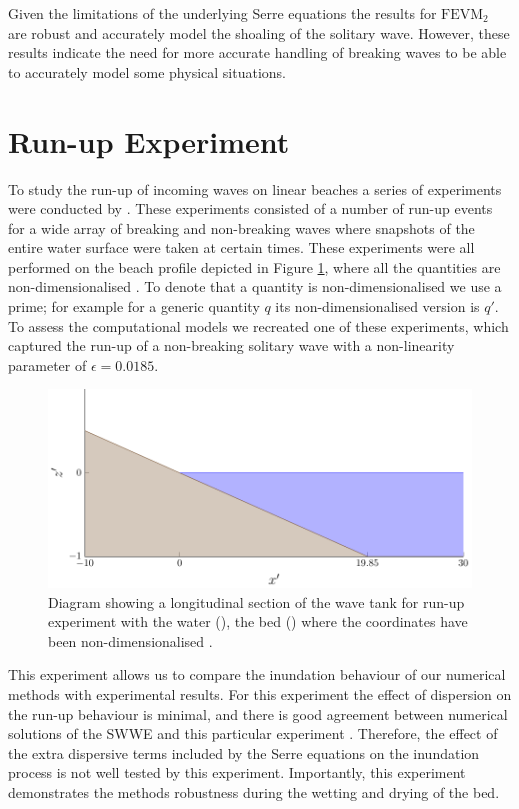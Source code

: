 Given the limitations of the underlying Serre equations the results for $\text{FEVM}_2$ are robust and accurately model the shoaling of the solitary wave. However, these results indicate the need for more accurate handling of breaking waves to be able to accurately model some physical situations. 

\section{Run-up Experiment}
To study the run-up of incoming waves on linear beaches a series of experiments were conducted by \citet{Synolakis-1987-523}. These experiments consisted of a number of run-up events for a wide array of breaking and non-breaking waves where snapshots of the entire water surface were taken at certain times. These experiments were all performed on the beach profile depicted in Figure \ref{fig:SynolakisWT}, where all the quantities are non-dimensionalised \cite{Synolakis-1987-523}. To denote that a quantity is non-dimensionalised we use a prime; for example for a generic quantity $q$ its non-dimensionalised version is $q'$. To assess the computational models we recreated one of these experiments, which captured the run-up of a non-breaking solitary wave with a non-linearity parameter of $\epsilon = 0.0185$.
\begin{figure}
	\centering
	\includegraphics[width=\textwidth]{./chp6/figures/Experiment/Synolakis/WavetankArtifical.pdf}
	\caption{Diagram showing a longitudinal section of the wave tank for run-up experiment with the water (), the bed () where the coordinates have been non-dimensionalised \cite{Synolakis-1987-523}.}
	\label{fig:SynolakisWT}
\end{figure}

This experiment allows us to compare the inundation behaviour of our numerical methods with experimental results. For this experiment the effect of dispersion on the run-up behaviour is minimal, and there is good agreement between numerical solutions of the SWWE and this particular experiment \cite{Bollermann-etal-2011-271}. Therefore, the effect of the extra dispersive terms included by the Serre equations on the inundation process is not well tested by this experiment. Importantly, this experiment demonstrates the methods robustness during the wetting and drying of the bed. 

